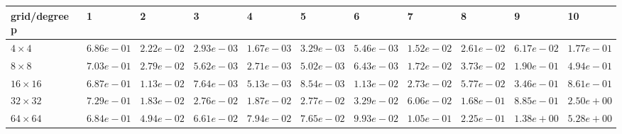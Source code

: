 \begin{tabular}{lllllllllll}
\hline
 grid/degree p   & 1          & 2          & 3          & 4          & 5          & 6          & 7          & 8          & 9          & 10         \\
\hline
 $4 \times 4$    & $6.86e-01$ & $2.22e-02$ & $2.93e-03$ & $1.67e-03$ & $3.29e-03$ & $5.46e-03$ & $1.52e-02$ & $2.61e-02$ & $6.17e-02$ & $1.77e-01$ \\
 $8 \times 8$    & $7.03e-01$ & $2.79e-02$ & $5.62e-03$ & $2.71e-03$ & $5.02e-03$ & $6.43e-03$ & $1.72e-02$ & $3.73e-02$ & $1.90e-01$ & $4.94e-01$ \\
 $16 \times 16$  & $6.87e-01$ & $1.13e-02$ & $7.64e-03$ & $5.13e-03$ & $8.54e-03$ & $1.13e-02$ & $2.73e-02$ & $5.77e-02$ & $3.46e-01$ & $8.61e-01$ \\
 $32 \times 32$  & $7.29e-01$ & $1.83e-02$ & $2.76e-02$ & $1.87e-02$ & $2.77e-02$ & $3.29e-02$ & $6.06e-02$ & $1.68e-01$ & $8.85e-01$ & $2.50e+00$ \\
 $64 \times 64$  & $6.84e-01$ & $4.94e-02$ & $6.61e-02$ & $7.94e-02$ & $7.65e-02$ & $9.93e-02$ & $1.05e-01$ & $2.25e-01$ & $1.38e+00$ & $5.28e+00$ \\
\hline
\end{tabular}